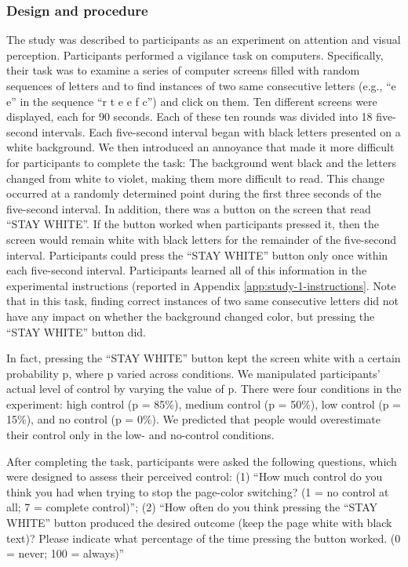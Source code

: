 \documentclass[USenglish,letterpaper,12pt,extrafontsizes,oneside,onecolumn,final]{memoir}
\begin{document}
\subsubsection{Design and procedure}
The study was described to participants as an experiment on attention and visual perception. Participants performed a vigilance task on computers. Specifically, their task was to examine a series of computer screens filled with random sequences of letters and to find instances of two same consecutive letters (e.g., ``e e'' in the sequence ``r t e e f c'') and click on them. Ten different screens were displayed, each for 90 seconds. Each of these ten rounds was divided into 18 five-second intervals. Each five-second interval began with black letters presented on a white background. We then introduced an annoyance that made it more difficult for participants to complete the task: The background went black and the letters changed from white to violet, making them more difficult to read. This change occurred at a randomly determined point during the first three seconds of the five-second interval. In addition, there was a button on the screen that read ``STAY WHITE''. If the button worked when participants pressed it, then the screen would remain white with black letters for the remainder of the five-second interval. Participants could press the ``STAY WHITE'' button only once within each five-second interval. Participants learned all of this information in the experimental instructions (reported in Appendix \ref{app:study-1-instructions}. Note that in this task, finding correct instances of two same consecutive letters did not have any impact on whether the background changed color, but pressing the ``STAY WHITE'' button did.

In fact, pressing the ``STAY WHITE'' button kept the screen white with a certain probability p, where p varied across conditions. We manipulated participants' actual level of control by varying the value of p. There were four conditions in the experiment: high control (p = 85\%), medium control (p = 50\%), low control (p = 15\%), and no control (p = 0\%). We predicted that people would overestimate their control only in the low- and no-control conditions. 

After completing the task, participants were asked the following questions, which were designed to assess their perceived control: (1) ``How much control do you think you had when trying to stop the page-color switching? (1 = no control at all; 7 = complete control)''; (2) ``How often do you think pressing the ``STAY WHITE'' button produced the desired outcome (keep the page white with black text)?  Please indicate what percentage of the time pressing the button worked. (0 = never; 100 = always)'' 
\end{document}
